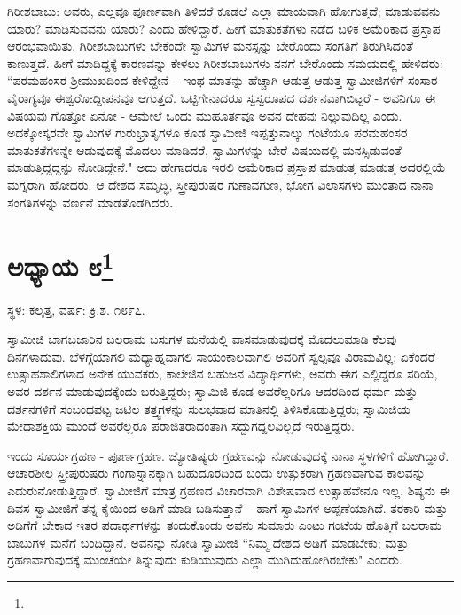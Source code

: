 ಗಿರೀಶಬಾಬು: ಅವರು, ಎಲ್ಲವೂ ಪೂರ್ಣವಾಗಿ ತಿಳಿದರೆ ಕೂಡಲೆ ಎಲ್ಲಾ ಮಾಯವಾಗಿ ಹೋಗುತ್ತದೆ; ಮಾಡುವವನು ಯಾರು? ಮಾಡಿಸುವವನು ಯಾರು? ಎಂದು ಹೇಳಿದ್ದಾರೆ. ಹೀಗೆ ಮಾತುಕತೆಗಳು ನಡೆದ ಬಳಿಕ ಅಮೆರಿಕಾದ ಪ್ರಸ್ತಾಪ ಆರಂಭವಾಯಿತು. ಗಿರೀಶಬಾಬುಗಳು ಬೇಕೆಂದೇ ಸ್ವಾಮಿಗಳ ಮನಸ್ಸನ್ನು ಬೇರೊಂದು ಸಂಗತಿಗೆ ತಿರುಗಿಸಿದಂತೆ ಕಾಣುತ್ತದೆ. ಹೀಗೆ ಮಾಡಿದ್ದಕ್ಕೆ ಕಾರಣವನ್ನು ಕೇಳಲು ಗಿರೀಶಬಾಬುಗಳು ನನಗೆ ಬೇರೊಂದು ಸಮಯದಲ್ಲಿ ಹೇಳಿದರು: “ಪರಮಹಂಸರ ಶ‍್ರೀಮುಖದಿಂದ ಕೇಳಿದ್ದೇನೆ – ಇಂಥ ಮಾತನ್ನು ಹೆಚ್ಚಾಗಿ ಆಡುತ್ತ ಆಡುತ್ತ ಸ್ವಾಮೀಜಿಗಳಿಗೆ ಸಂಸಾರ ವೈರಾಗ್ಯವೂ ಈಶ್ವರೋದ್ದೀಪನವೂ ಆಗುತ್ತದೆ. ಒಟ್ಟಿಗೇನಾದರೂ ಸ್ವಸ್ವರೂಪದ ದರ್ಶನವಾಗಿಬಿಟ್ಟರೆ - ಅವನಿಗೂ ಈ ವಿಷಯವು ಗೊತ್ತೋ ಏನೋ - ಆಮೇಲೆ ಒಂದು ಮುಹೂರ್ತವೂ ಅವನ ದೇಹವು ನಿಲ್ಲುವುದಿಲ್ಲ ಎಂದು. ಅದಕ್ಕೋಸ್ಕರವೇ ಸ್ವಾಮಿಗಳ ಗುರುಭ್ರಾತೃಗಳೂ ಕೂಡ ಸ್ವಾಮೀಜಿ ಇಪ್ಪತ್ತುನಾಲ್ಕು ಗಂಟೆಯೂ ಪರಮಹಂಸರ ಮಾತುಕತೆಗಳನ್ನೇ ಆಡುವುದಕ್ಕೆ ಮೊದಲು ಮಾಡಿದರೆ, ಸ್ವಾಮಿಗಳನ್ನು ಬೇರೆ ವಿಷಯದಲ್ಲಿ ಮನಸ್ಸಿಡುವಂತೆ ಮಾಡುತ್ತಿದ್ದದ್ದನ್ನು ನೋಡಿದ್ದೇನೆ." ಅದು ಹೇಗಾದರೂ ಇರಲಿ ಅಮೆರಿಕಾದ ಪ್ರಸ್ತಾಪ ಮಾಡುತ್ತ ಮಾಡುತ್ತ ಅದರಲ್ಲಿಯೆ ಮಗ್ನರಾಗಿ ಹೋದರು. ಆ ದೇಶದ ಸಮೃದ್ಧಿ, ಸ್ತ್ರೀಪುರುಷರ ಗುಣಾವಗುಣ, ಭೋಗ ವಿಲಾಸಗಳು ಮುಂತಾದ ನಾನಾ ಸಂಗತಿಗಳನ್ನು ವರ್ಣನೆ ಮಾಡತೊಡಗಿದರು.

\newpage

\chapter[ಅಧ್ಯಾಯ ೮]{ಅಧ್ಯಾಯ ೮\protect\footnote{}}

\begin{center}
ಸ್ಥಳ: ಕಲ್ಕತ್ತ, ವರ್ಷ: ಕ್ರಿ.ಶ. ೧೮೯೭.
\end{center}

ಸ್ವಾಮೀಜಿ ಬಾಗಬಜಾರಿನ ಬಲರಾಮ ಬಸುಗಳ ಮನೆಯಲ್ಲಿ ವಾಸಮಾಡುವುದಕ್ಕೆ ಮೊದಲುಮಾಡಿ ಕೆಲವು ದಿನಗಳಾದುವು. ಬೆಳಗ್ಗೆಯಾಗಲಿ ಮಧ್ಯಾಹ್ನವಾಗಲಿ ಸಾಯಂಕಾಲವಾಗಲಿ ಅವರಿಗೆ ಸ್ವಲ್ಪವೂ ವಿರಾಮವಿಲ್ಲ; ಏಕೆಂದರೆ ಉತ್ಸಾಹಶಾಲಿಗಳಾದ ಅನೇಕ ಯುವಕರು, ಕಾಲೇಜಿನ ಬಹುಜನ ವಿದ್ಯಾರ್ಥಿಗಳು, ಅವರು ಈಗ ಎಲ್ಲಿದ್ದರೂ ಸರಿಯೆ, ಅವರ ದರ್ಶನ ಮಾಡುವುದಕ್ಕೆಂದು ಬರುತ್ತಿದ್ದರು; ಸ್ವಾಮಿಜಿ ಕೂಡ ಅವರೆಲ್ಲರಿಗೂ ಆದರದಿಂದ ಧರ್ಮ ಮತ್ತು ದರ್ಶನಗಳಿಗೆ ಸಂಬಂಧಪಟ್ಟ ಜಟಿಲ ತತ್ತ್ವಗಳನ್ನು ಸುಲಭವಾದ ಮಾತಿನಲ್ಲಿ ತಿಳಿಸಿಕೊಡುತ್ತಿದ್ದರು; ಸ್ವಾಮಿಜಿಯ ಮೇಧಾಶಕ್ತಿಯ ಮುಂದೆ ಅವರೆಲ್ಲರೂ ಪರಾಜಿತರಾದಂತಾಗಿ ಸದ್ದುಗದ್ದಲವಿಲ್ಲದೆ ಇರುತ್ತಿದ್ದರು.

ಇಂದು ಸೂರ್ಯಗ್ರಹಣ - ಪೂರ್ಣಗ್ರಹಣ. ಜ್ಯೋತಿಷ್ಯರು ಗ್ರಹಣವನ್ನು ನೋಡುವುದಕ್ಕೆ ನಾನಾ ಸ್ಥಳಗಳಿಗೆ ಹೋಗಿದ್ದಾರೆ. ಆಚಾರಶೀಲ ಸ್ತ್ರೀಪುರುಷರು ಗಂಗಾಸ್ನಾನಕ್ಕಾಗಿ ಬಹುದೂರದಿಂದ ಬಂದು ಉತ್ಸುಕರಾಗಿ ಗ್ರಹಣವಾಗುವ ಕಾಲವನ್ನು ಎದುರುನೋಡುತ್ತಿದ್ದಾರೆ. ಸ್ವಾಮೀಜಿಗೆ ಮಾತ್ರ ಗ್ರಹಣದ ವಿಚಾರವಾಗಿ ವಿಶೇಷವಾದ ಉತ್ಸಾಹವೇನೂ ಇಲ್ಲ. ಶಿಷ್ಯನು ಈ ದಿವಸ ಸ್ವಾಮೀಜಿಗೆ ತನ್ನ ಕೈಯಿಂದ ಅಡಿಗೆ ಮಾಡಿ ಬಡಿಸುತ್ತಾನೆ – ಹಾಗೆ ಸ್ವಾಮಿಗಳ ಅಪ್ಪಣೆಯಾಗಿದೆ. ತರಕಾರಿ ಮತ್ತು ಅಡಿಗೆಗೆ ಬೇಕಾದ ಇತರ ಪದಾರ್ಥಗಳನ್ನು ತಂದುಕೊಂಡು ಅವನು ಸುಮಾರು ಎಂಟು ಗಂಟೆಯ ಹೊತ್ತಿಗೆ ಬಲರಾಮ ಬಾಬುಗಳ ಮನೆಗೆ ಬಂದಿದ್ದಾನೆ. ಅವನನ್ನು ನೋಡಿ ಸ್ವಾಮೀಜಿ “ನಿಮ್ಮ ದೇಶದ ಅಡಿಗೆ ಮಾಡಬೇಕು; ಮತ್ತು ಗ್ರಹಣವಾಗುವುದಕ್ಕೆ ಮುಂಚೆಯೇ ತಿನ್ನುವುದು ಕುಡಿಯುವುದು ಎಲ್ಲಾ ಮುಗಿದುಹೋಗಿರಬೇಕು" ಎಂದರು.

